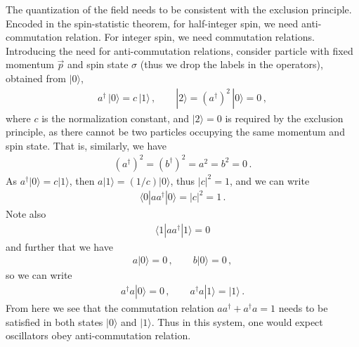 \documentclass[11pt, onesided]{book}
\theoremstyle{break}
\theoremstyle{break}
\begin{document}
The quantization of the field needs to be consistent with the exclusion principle. Encoded in the spin-statistic theorem, for half-integer spin, we need anti-commutation relation. For integer spin, we need commutation relations. Introducing the need for anti-commutation relations, consider particle with fixed momentum $\vec{p}$ and spin state $\sigma$ (thus we drop the labels in the operators), obtained from $|0\rangle$,
\begin{align*}
a^\dagger \, |0\rangle = c\, |1\rangle\,,\qquad
|2\rangle = (a^\dagger)^2 \, |0\rangle = 0\,,
\end{align*}
where $c$ is the normalization constant, and $|2\rangle = 0$ is required by the exclusion principle, as there cannot be two particles occupying the same momentum and spin state. That is, similarly, we have
\begin{align*}
(a^\dagger)^2 = (b^\dagger)^2 = a^2 = b^2 = 0\,.
\end{align*}
As $a^\dagger|0\rangle = c|1\rangle$, then $a|1\rangle =(1/c) |0\rangle$, thus $|c|^2 = 1$, and we can write
\begin{align*}
\langle 0 |aa^\dagger|0 \rangle = |c|^2 = 1\,.
\end{align*}
Note also
\begin{align*}
\langle 1 | aa^\dagger | 1\rangle = 0
\end{align*}
and further that we have
\begin{align*}
a|0\rangle = 0 \,,\qquad b|0\rangle = 0\,,
\end{align*}
so we can write
\begin{align*}
a^\dagger a|0\rangle = 0\,,\qquad
a^\dagger a|1\rangle = |1\rangle\,.
\end{align*}
From here we see that the commutation relation $aa^\dagger  + a^\dagger a = 1$ needs to be satisfied in both states $|0\rangle $ and $|1\rangle$. Thus in this system, one would expect oscillators obey anti-commutation relation. \\
\end{document}
